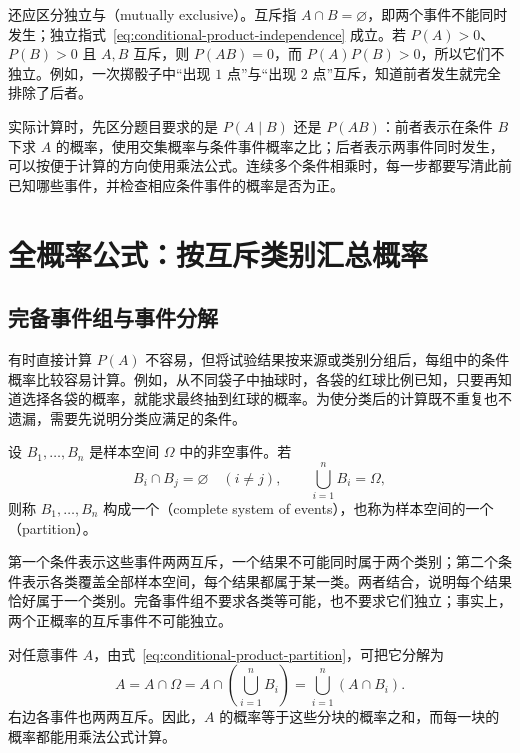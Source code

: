 \documentclass[UTF8]{ctexart}
\begin{document}
还应区分独立与（mutually exclusive）。互斥指 $A\cap B=\varnothing$，即两个事件不能同时发生；独立指式~\eqref{eq:conditional-product-independence} 成立。若 $P(A)>0$、$P(B)>0$ 且 $A,B$ 互斥，则 $P(AB)=0$，而 $P(A)P(B)>0$，所以它们不独立。例如，一次掷骰子中“出现 $1$ 点”与“出现 $2$ 点”互斥，知道前者发生就完全排除了后者。

实际计算时，先区分题目要求的是 $P(A\mid B)$ 还是 $P(AB)$：前者表示在条件 $B$ 下求 $A$ 的概率，使用交集概率与条件事件概率之比；后者表示两事件同时发生，可以按便于计算的方向使用乘法公式。连续多个条件相乘时，每一步都要写清此前已知哪些事件，并检查相应条件事件的概率是否为正。

\section{全概率公式：按互斥类别汇总概率}
\label{sec:conditional-product-total}

\subsection{完备事件组与事件分解}

有时直接计算 $P(A)$ 不容易，但将试验结果按来源或类别分组后，每组中的条件概率比较容易计算。例如，从不同袋子中抽球时，各袋的红球比例已知，只要再知道选择各袋的概率，就能求最终抽到红球的概率。为使分类后的计算既不重复也不遗漏，需要先说明分类应满足的条件。

\begin{definition}[有限完备事件组]
\label{def:conditional-product-partition}
设 $B_1,\ldots,B_n$ 是样本空间 $\Omega$ 中的非空事件。若
\begin{equation}
  B_i\cap B_j=\varnothing\quad(i\ne j),
  \qquad
  \bigcup_{i=1}^{n}B_i=\Omega,
  \label{eq:conditional-product-partition}
\end{equation}
则称 $B_1,\ldots,B_n$ 构成一个（complete system of events），也称为样本空间的一个（partition）。
\end{definition}

第一个条件表示这些事件两两互斥，一个结果不可能同时属于两个类别；第二个条件表示各类覆盖全部样本空间，每个结果都属于某一类。两者结合，说明每个结果恰好属于一个类别。完备事件组不要求各类等可能，也不要求它们独立；事实上，两个正概率的互斥事件不可能独立。

对任意事件 $A$，由式~\eqref{eq:conditional-product-partition}，可把它分解为
\begin{equation}
  A=A\cap\Omega
   =A\cap\left(\bigcup_{i=1}^{n}B_i\right)
   =\bigcup_{i=1}^{n}(A\cap B_i).
  \label{eq:conditional-product-decomposition}
\end{equation}
右边各事件也两两互斥。因此，$A$ 的概率等于这些分块的概率之和，而每一块的概率都能用乘法公式计算。
\end{document}
